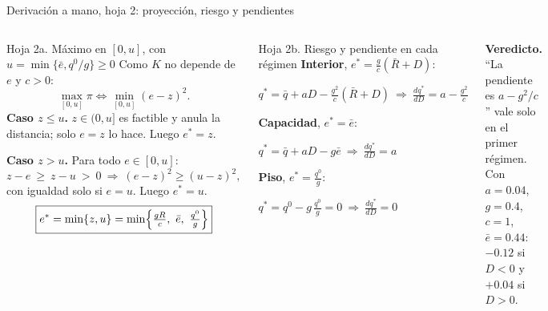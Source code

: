 \documentclass[aspectratio=169,10pt,t]{beamer}
\newcommand{\qz}{q^{0}}
\newcommand{\qs}{q^{*}}
\newcommand{\es}{e^{*}}
\newcommand{\eb}{\bar e}
\begin{document}
\begin{frame}{Derivación a mano, hoja 2: proyección, riesgo y pendientes}
\begin{columns}[T,onlytextwidth]
\begin{hoja}{Hoja 2a. Máximo en $[0,u]$, con $u=\min\{\eb,\qz/g\}\ge 0$}
\small
Como $K$ no depende de $e$ y $c>0$:
\[\max_{[0,u]}\pi\iff\min_{[0,u]}(e-z)^{2}.\]
\textbf{Caso $z\le u$.} $z\in(0,u]$ es factible y anula la distancia; solo $e=z$ lo
hace. Luego $\es=z$.

\textbf{Caso $z>u$.} Para todo $e\in[0,u]$:
\[
z-e\ \ge\ z-u\ >\ 0\ \Rightarrow\ (e-z)^{2}\ge(u-z)^{2},
\]
con igualdad solo si $e=u$. Luego $\es=u$.
\[
\boxed{\es=\min\{z,u\}=\min\Bigl\{\tfrac{gR}{c},\ \eb,\ \tfrac{\qz}{g}\Bigr\}}
\]
\end{hoja}
\begin{hoja}{Hoja 2b. Riesgo y pendiente en cada régimen}
\small
\textbf{Interior}, $\es=\tfrac{g}{c}(\bar R+D)$:\\[.3mm]
\centerline{$\qs=\bar q+aD-\tfrac{g^{2}}{c}(\bar R+D)\ \Rightarrow\ \tfrac{d\qs}{dD}=a-\tfrac{g^{2}}{c}$}

\vspace{1mm}
\textbf{Capacidad}, $\es=\eb$:\\[.3mm]
\centerline{$\qs=\bar q+aD-g\eb\ \Rightarrow\ \tfrac{d\qs}{dD}=a$}

\vspace{1mm}
\textbf{Piso}, $\es=\tfrac{\qz}{g}$:\\[.3mm]
\centerline{$\qs=\qz-g\,\tfrac{\qz}{g}=0\ \Rightarrow\ \tfrac{d\qs}{dD}=0$}
\end{hoja}
\vspace{-.5mm}
\begin{keybox}\footnotesize
\textbf{Veredicto.} ``La pendiente es $a-g^{2}/c$'' vale solo en el primer régimen.
Con $a=0.04$, $g=0.4$, $c=1$, $\eb=0.44$: $-0.12$ si $D<0$ y $+0.04$ si $D>0$.
\end{keybox}
\end{columns}
\end{frame}
\end{document}
